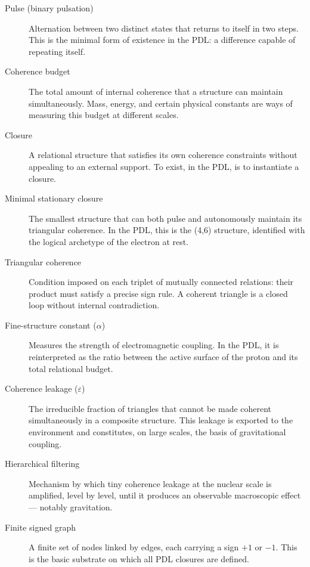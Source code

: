 \documentclass[11pt, a4paper, openright]{book}
\begin{document}
\begin{description}

\item[Pulse (binary pulsation)] Alternation between two distinct states that returns to itself in two steps. This is the minimal form of existence in the PDL: a difference capable of repeating itself.

\item[Coherence budget] The total amount of internal coherence that a structure can maintain simultaneously. Mass, energy, and certain physical constants are ways of measuring this budget at different scales.

\item[Closure] A relational structure that satisfies its own coherence constraints without appealing to an external support. To exist, in the PDL, is to instantiate a closure.

\item[Minimal stationary closure] The smallest structure that can both pulse and autonomously maintain its triangular coherence. In the PDL, this is the (4,6) structure, identified with the logical archetype of the electron at rest.

\item[Triangular coherence] Condition imposed on each triplet of mutually connected relations: their product must satisfy a precise sign rule. A coherent triangle is a closed loop without internal contradiction.

\item[Fine-structure constant ($\alpha$)] Measures the strength of electromagnetic coupling. In the PDL, it is reinterpreted as the ratio between the active surface of the proton and its total relational budget.

\item[Coherence leakage ($\varepsilon$)] The irreducible fraction of triangles that cannot be made coherent simultaneously in a composite structure. This leakage is exported to the environment and constitutes, on large scales, the basis of gravitational coupling.

\item[Hierarchical filtering] Mechanism by which tiny coherence leakage at the nuclear scale is amplified, level by level, until it produces an observable macroscopic effect — notably gravitation.

\item[Finite signed graph] A finite set of nodes linked by edges, each carrying a sign $+1$ or $-1$. This is the basic substrate on which all PDL closures are defined.


\end{description}
\end{document}

